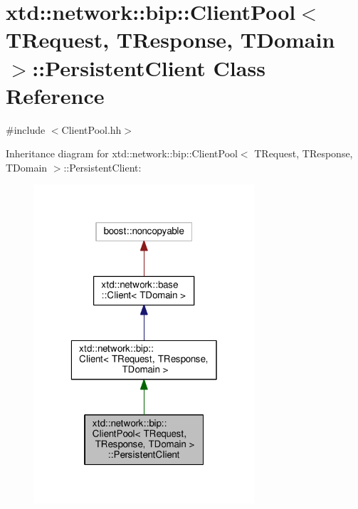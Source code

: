 \hypertarget{classxtd_1_1network_1_1bip_1_1ClientPool_1_1PersistentClient}{\section{xtd\-:\-:network\-:\-:bip\-:\-:Client\-Pool$<$ T\-Request, T\-Response, T\-Domain $>$\-:\-:Persistent\-Client Class Reference}
\label{classxtd_1_1network_1_1bip_1_1ClientPool_1_1PersistentClient}
}


{\ttfamily \#include $<$Client\-Pool.\-hh$>$}



Inheritance diagram for xtd\-:\-:network\-:\-:bip\-:\-:Client\-Pool$<$ T\-Request, T\-Response, T\-Domain $>$\-:\-:Persistent\-Client\-:
\nopagebreak
\begin{figure}[H]
\begin{center}
\leavevmode
\includegraphics[width=232pt]{classxtd_1_1network_1_1bip_1_1ClientPool_1_1PersistentClient__inherit__graph}
\end{center}
\end{figure}


